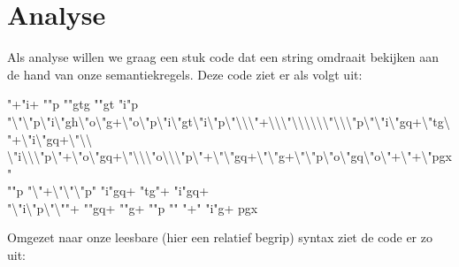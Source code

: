 \section{Analyse}
\label{sec:analyse}
Als analyse willen we graag een stuk code dat een string omdraait bekijken aan
de hand van onze semantiekregels. Deze code ziet er als volgt uit:
\begin{smurf}
	\footnotesize
	"+"i+ ""p ""gtg ""gt "i"p\\
	"\textbackslash{}"\textbackslash{}"p\textbackslash{}"i\textbackslash{}"gh\textbackslash{}"o\textbackslash{}"g+\textbackslash{}"o\textbackslash{}"p\textbackslash{}"i\textbackslash{}"gt\textbackslash{}"i\textbackslash{}"p\textbackslash{}"\textbackslash{}\textbackslash{}\textbackslash{}"+\textbackslash{}\textbackslash{}\textbackslash{}"\textbackslash{}\textbackslash{}\textbackslash{}\textbackslash{}\textbackslash{}\textbackslash{}"\textbackslash{}\textbackslash{}\textbackslash{}"p\textbackslash{}"\textbackslash{}"i\textbackslash{}"gq+\textbackslash{}"tg\textbackslash{}"+\textbackslash{}"i\textbackslash{}"gq+\textbackslash{}"\textbackslash{}\textbackslash{}\\
    \textbackslash{}"i\textbackslash{}\textbackslash{}\textbackslash{}"p\textbackslash{}"+\textbackslash{}"o\textbackslash{}"gq+\textbackslash{}"\textbackslash{}\textbackslash{}\textbackslash{}"o\textbackslash{}\textbackslash{}\textbackslash{}"p\textbackslash{}"+\textbackslash{}"\textbackslash{}"gq+\textbackslash{}"\textbackslash{}"g+\textbackslash{}"\textbackslash{}"p\textbackslash{}"o\textbackslash{}"gq\textbackslash{}"o\textbackslash{}"+\textbackslash{}"+\textbackslash{}"pgx"\\
	""p "\textbackslash{}"+\textbackslash{}"\textbackslash{}"\textbackslash{}"p" "i"gq+ "tg"+ "i"gq+\\
	"\textbackslash{}"i\textbackslash{}"p\textbackslash{}"\textbackslash{}""+ ""gq+ ""g+ ""p "" "+" "i"g+ pgx
\end{smurf}

Omgezet naar onze leesbare (hier een relatief begrip) syntax ziet de code er zo uit:

